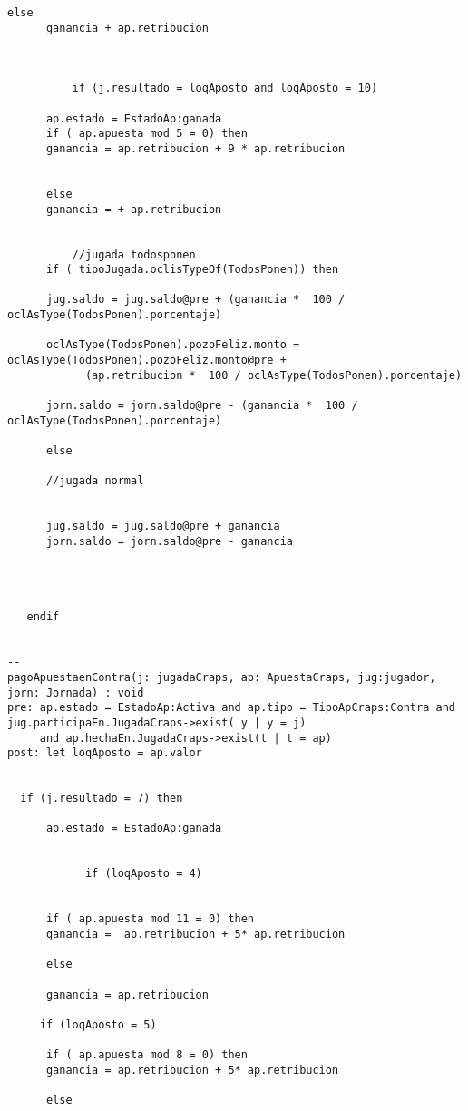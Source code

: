 \begin{framed}
\begin{lstlisting}[breaklines=true]
      else
      ganancia + ap.retribucion 
      


          if (j.resultado = loqAposto and loqAposto = 10)

      ap.estado = EstadoAp:ganada
      if ( ap.apuesta mod 5 = 0) then
      ganancia = ap.retribucion + 9 * ap.retribucion
      

      else
      ganancia = + ap.retribucion 
    

          //jugada todosponen
      if ( tipoJugada.oclisTypeOf(TodosPonen)) then 
    
      jug.saldo = jug.saldo@pre + (ganancia *  100 / oclAsType(TodosPonen).porcentaje)
    
      oclAsType(TodosPonen).pozoFeliz.monto = oclAsType(TodosPonen).pozoFeliz.monto@pre + 
            (ap.retribucion *  100 / oclAsType(TodosPonen).porcentaje)

      jorn.saldo = jorn.saldo@pre - (ganancia *  100 / oclAsType(TodosPonen).porcentaje)

      else

      //jugada normal


      jug.saldo = jug.saldo@pre + ganancia
      jorn.saldo = jorn.saldo@pre - ganancia  
      
  


   endif

------------------------------------------------------------------------
pagoApuestaenContra(j: jugadaCraps, ap: ApuestaCraps, jug:jugador, jorn: Jornada) : void
pre: ap.estado = EstadoAp:Activa and ap.tipo = TipoApCraps:Contra and jug.participaEn.JugadaCraps->exist( y | y = j) 
     and ap.hechaEn.JugadaCraps->exist(t | t = ap)
post: let loqAposto = ap.valor
  

  if (j.resultado = 7) then

      ap.estado = EstadoAp:ganada
      
  
            if (loqAposto = 4)

      
      if ( ap.apuesta mod 11 = 0) then
      ganancia =  ap.retribucion + 5* ap.retribucion
      
      else
      
      ganancia = ap.retribucion 
      
     if (loqAposto = 5)

      if ( ap.apuesta mod 8 = 0) then
      ganancia = ap.retribucion + 5* ap.retribucion
      
      else
      

\end{lstlisting}
\end{framed}
